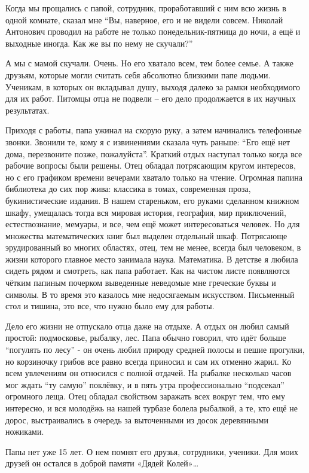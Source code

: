 
\vzmscaption

Когда мы прощались с папой, сотрудник, проработавший с ним всю жизнь в одной комнате, сказал мне “Вы, наверное, его и не видели совсем. Николай Антонович проводил на работе не только понедельник-пятница до ночи, а ещё и выходные иногда. Как же вы по нему не скучали?”

А мы с мамой скучали. Очень. Но его хватало всем, тем более семье. А также друзьям, которые могли считать себя абсолютно близкими папе людьми. Ученикам, в которых он вкладывал душу, выходя далеко за рамки необходимого для их работ. Питомцы отца не подвели – его дело продолжается в их научных результатах.

Приходя с работы, папа ужинал на скорую руку, а затем начинались телефонные звонки. Звонили те, кому я с извинениями сказала чуть раньше: “Его ещё нет дома, перезвоните позже, пожалуйста”. Краткий отдых наступал только когда все рабочие вопросы были решены. Отец обладал потрясающим кругом интересов, но с его графиком времени вечерами хватало только на чтение. Огромная папина библиотека до сих пор жива: классика в томах, современная проза, букинистические издания. В нашем стареньком, его руками сделанном книжном шкафу, умещалась тогда вся мировая история, география, мир приключений, естествознание, мемуары, и все, чем ещё может интересоваться человек. Но для множества математических книг был выделен отдельный шкаф. Потрясающе эрудированный во многих областях, отец, тем не менее, всегда был человеком, в жизни которого главное место занимала наука. Математика. В детстве я любила сидеть рядом и смотреть, как папа работает. Как на чистом листе появляются чётким папиным почерком выведенные неведомые мне греческие буквы и символы. В то время это казалось мне недосягаемым искусством. Письменный стол и тишина, это все, что нужно было ему для работы.

Дело его жизни не отпускало отца даже на отдыхе. А отдых он любил самый простой: подмосковье, рыбалку, лес. Папа обычно говорил, что идёт больше “погулять по лесу” - он очень любил природу средней полосы и пешие прогулки, но корзиночку грибов все равно всегда приносил и сам их отменно жарил. Ко всем увлечениям он относился с полной отдачей. На рыбалке несколько часов мог ждать “ту самую” поклёвку, и в пять утра профессионально “подсекал” огромного леща. Отец обладал свойством заражать всех вокруг тем, что ему интересно, и вся молодёжь на нашей турбазе болела рыбалкой, а те, кто ещё не дорос, выстраивались в очередь за выточенными из досок деревянными ножиками.

Папы нет уже 15 лет. О нем помнят его друзья, сотрудники, ученики. Для моих друзей он остался в доброй памяти «Дядей Колей»…
